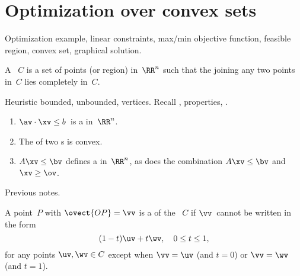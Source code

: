 
\chapter{Optimization over convex sets}

\begin{comment}
Convex sets has pedagogical value: it revises previous material in a new context, it introduces modelling techniques, it sets a systematic tone for the course, it prepares students for further courses.
\end{comment}

\begin{remark} Optimization example, linear constraints, max/min objective function, feasible region, convex set, graphical solution.
\end{remark}

\begin{definition}
 A ~$C$ is a set of points (or region) in~$\RR^n$ such that the  joining any two points in~$C$
lies completely in~$C$.
\end{definition}

\begin{remark}
Heuristic bounded, unbounded, vertices.
Recall , properties, .
\end{remark}


\begin{theorem} \label{thm:}
\begin{enumerate}
\item $\av\cdot\xv\leq b$~is a  in~$\RR^{n}$.
\item The  of two s is convex.
\item $A\xv\le \bv$ defines a  in~$\RR^n$, as does 
the combination $A\xv\le \bv$ and $\xv\ge \ov$.
\end{enumerate}
\end{theorem}
\begin{prof} Previous notes.
\end{prof}


\begin{definition}
A point~$P$ with  
$\ovect{OP} ={\vv}$ 
is a  of the ~$C$ if ${\vv}$~cannot be written in
the form
\begin{equation*}
(1-t){\uv}+t{\wv},\quad 0\leq t\leq 1,
\end{equation*}
for any points ${\uv},{\wv}\in C$ except when ${\vv}= {\uv}$ (and
$t=0$) or ${\vv}={\wv}$ (and $t=1$).
\end{definition}

